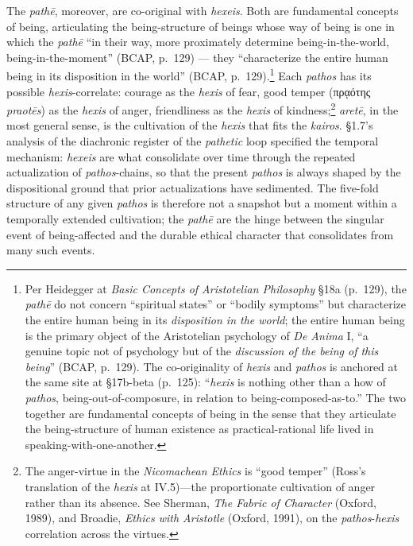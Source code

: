 \documentclass{article}
\newcommand{\gk}[1]{{\greekfont #1}}
\begin{document}
The \textit{pathē}, moreover, are co-original with \textit{hexeis}. Both are fundamental concepts of being, articulating the being-structure of beings whose way of being is one in which the \textit{pathē} ``in their way, more proximately determine being-in-the-world, being-in-the-moment'' (BCAP, p.~129) --- they ``characterize the entire human being in its disposition in the world'' (BCAP, p.~129).\footnote{Per Heidegger at \textit{Basic Concepts of Aristotelian Philosophy} \S 18a (p.~129), the \textit{pathē} do not concern ``spiritual states'' or ``bodily symptoms'' but characterize the entire human being in its \textit{disposition in the world}; the entire human being is the primary object of the Aristotelian psychology of \textit{De Anima} I, ``a genuine topic not of psychology but of the \textit{discussion of the being of this being}'' (BCAP, p.~129). The co-originality of \textit{hexis} and \textit{pathos} is anchored at the same site at \S 17b-beta (p.~125): ``\textit{hexis} is nothing other than a how of \textit{pathos}, being-out-of-composure, in relation to being-composed-as-to.'' The two together are fundamental concepts of being in the sense that they articulate the being-structure of human existence as practical-rational life lived in speaking-with-one-another.} Each \textit{pathos} has its possible \textit{hexis}-correlate: courage as the \textit{hexis} of fear, good temper (\gk{πρᾳότης} \textit{praot\=es}) as the \textit{hexis} of anger, friendliness as the \textit{hexis} of kindness;\footnote{The anger-virtue in the \textit{Nicomachean Ethics} is ``good temper'' (Ross's translation of the \textit{hexis} at IV.5)---the proportionate cultivation of anger rather than its absence. See Sherman, \textit{The Fabric of Character} (Oxford, 1989), and Broadie, \textit{Ethics with Aristotle} (Oxford, 1991), on the \textit{pathos}-\textit{hexis} correlation across the virtues.} \textit{aretē}, in the most general sense, is the cultivation of the \textit{hexis} that fits the \textit{kairos}. \S1.7's analysis of the diachronic register of the \textit{pathetic} loop specified the temporal mechanism: \textit{hexeis} are what consolidate over time through the repeated actualization of \textit{pathos}-chains, so that the present \textit{pathos} is always shaped by the dispositional ground that prior actualizations have sedimented. The five-fold structure of any given \textit{pathos} is therefore not a snapshot but a moment within a temporally extended cultivation; the \textit{pathē} are the hinge between the singular event of being-affected and the durable ethical character that consolidates from many such events.
\end{document}
